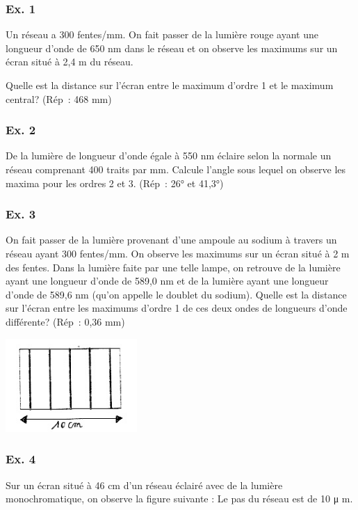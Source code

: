 \subsubsection{Ex. 1}

Un réseau a 300 fentes/mm. On fait passer de la lumière rouge ayant une
longueur d'onde de 650 nm dans le réseau et on observe les maximums sur
un écran situé à 2,4 m du réseau.

Quelle est la distance sur l'écran entre le maximum d'ordre 1 et le
maximum central? (Rép~: 468 mm)

\subsubsection{Ex. 2}

De la lumière de longueur d'onde égale à 550 nm éclaire selon la normale
un réseau comprenant 400 traits par mm. Calcule l'angle sous lequel on
observe les maxima pour les ordres 2 et 3.
(Rép~: 26° et 41,3°)

\subsubsection{Ex. 3}

On fait passer de la lumière provenant d'une ampoule au sodium à travers
un réseau ayant 300 fentes/mm. On observe les maximums sur un écran
situé à 2 m des fentes. Dans la lumière faite par une telle lampe, on
retrouve de la lumière ayant une longueur d'onde de 589,0 nm et de la
lumière ayant une longueur d'onde de 589,6 nm (qu'on appelle le doublet
du sodium). Quelle est la distance sur l'écran entre les maximums
d'ordre 1 de ces deux ondes de longueurs d'onde différente?
(Rép~: 0,36 mm)

\includegraphics[width=5.008cm,height=3.551cm]{Pictures/10000001000000C70000008D88834268E2E16F18.png}

\subsubsection{Ex. 4}

Sur un écran situé à 46 cm d'un réseau éclairé avec de la lumière
monochromatique, on observe la figure suivante : Le pas du réseau est de
10 μ m.

